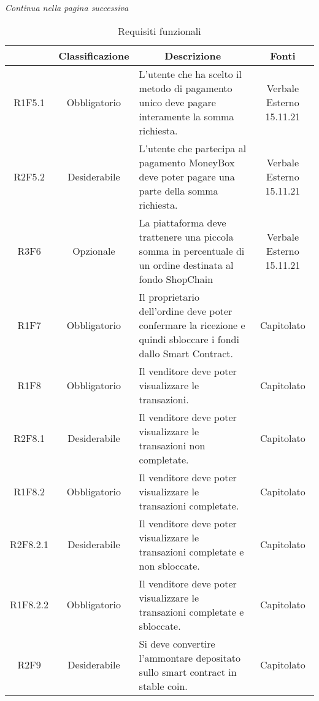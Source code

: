 \begin{center}
    \textit{\small Continua nella pagina successiva}
\end{center}
\begin{table}[H]
    \centering
    \renewcommand{\arraystretch}{1.8}
    \begin{tabular}{c | c | p{6cm} | c}
        \rowcolor[HTML]{125E28} 
        \multicolumn{1}{c}{\color[HTML]{FFFFFF} \textbf{Codice}} & 
		\multicolumn{1}{c}{\color[HTML]{FFFFFF} \textbf{Classificazione}} & 
		\multicolumn{1}{c}{\color[HTML]{FFFFFF} \textbf{Descrizione}} & 
		\multicolumn{1}{c}{\color[HTML]{FFFFFF} \textbf{Fonti}} \\
        \hline
        R1F5.1 & Obbligatorio & L'utente che ha scelto il metodo di pagamento unico deve pagare interamente la somma richiesta. & Verbale Esterno 15.11.21 \\
        R2F5.2 & Desiderabile & L'utente che partecipa al pagamento MoneyBox deve poter pagare una parte della somma richiesta. & Verbale Esterno 15.11.21 \\
        R3F6 & Opzionale & La piattaforma deve trattenere una piccola somma in percentuale di un ordine destinata al fondo ShopChain & Verbale Esterno 15.11.21 \\
        R1F7 & Obbligatorio & Il proprietario dell'ordine deve poter confermare la ricezione e quindi sbloccare i fondi dallo Smart Contract. & Capitolato \\
        R1F8 & Obbligatorio & Il venditore deve poter visualizzare le transazioni. & Capitolato \\
        R2F8.1 & Desiderabile & Il venditore deve poter visualizzare le transazioni non completate. & Capitolato \\
        R1F8.2 & Obbligatorio & Il venditore deve poter visualizzare le transazioni completate. & Capitolato \\
        R2F8.2.1 & Desiderabile & Il venditore deve poter visualizzare le transazioni completate e non sbloccate. & Capitolato \\
        R1F8.2.2 & Obbligatorio & Il venditore deve poter visualizzare le transazioni completate e sbloccate. & Capitolato \\
        R2F9 & Desiderabile & Si deve convertire l'ammontare depositato sullo smart contract in stable coin. & Capitolato \\ 
    \end{tabular}
    \caption{Requisiti funzionali}
\end{table}

